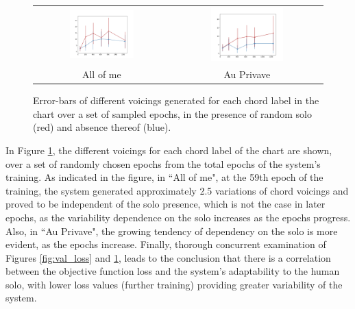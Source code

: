     \begin{figure}
    \centering
    \begin{tabular}{cc}
        \includegraphics[width=0.5\textwidth]{media/aom_voicings_errorbars.png} & \includegraphics[width=0.5\textwidth]{media/ap_voicings_errorbars.png} \\
        All of me & Au Privave
    \end{tabular}{}
    \caption{Error-bars of different voicings generated for each chord label in the chart over a set of sampled epochs, in the presence of random solo (red) and absence thereof (blue).}
    \label{fig:voicings}
    \end{figure}{}

    In Figure \ref{fig:voicings}, the different voicings for each chord label of the chart are shown, over a set of randomly chosen epochs from the total epochs of the system's training. As indicated in the figure, in ``All of me", at the 59th epoch of the training, the system  generated approximately 2.5 variations of chord voicings and proved to be independent of the solo presence, which is not the case in later epochs, as the variability dependence on the solo increases as the epochs progress. Also, in ``Au Privave", the growing tendency of dependency on the solo is more evident, as the epochs increase. Finally, thorough concurrent examination of Figures \ref{fig:val_loss} and \ref{fig:voicings}, leads to the conclusion that there is a correlation between the objective function loss and the system's adaptability to the human solo, with lower loss values (further training) providing greater variability of the system. 
    
